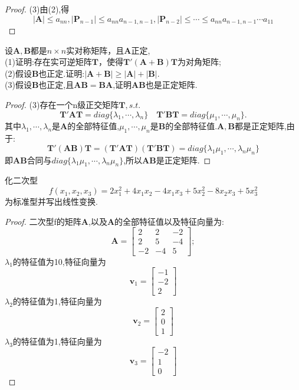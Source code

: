 \documentclass[lang=cn,11pt,normal]{elegantbook}
\begin{document}
	\begin{proof}
		(3)由(2),得
		$$
		|\boldsymbol{A}|\leq a_{nn},|\boldsymbol{P}_{n-1}|\leq a_{nn}a_{n-1,n-1},|\boldsymbol{P}_{n-2}|\leq \cdots\leq a_{nn}a_{n-1,n-1}\cdots a_{11}
		$$
	\end{proof}
	\begin{exercise}
		设$\boldsymbol{A},\boldsymbol{B}$都是$n\times n$实对称矩阵，且$\boldsymbol{A}$正定,\\
		(1)证明:存在实可逆矩阵$\boldsymbol{T}$，使得$\boldsymbol{T}'(\boldsymbol{A}+\boldsymbol{B})\boldsymbol{T}$为对角矩阵;\\
		(2)假设$\boldsymbol{B}$也正定.证明:$|\boldsymbol{A}+\boldsymbol{B}|\geq|\boldsymbol{A}|+|\boldsymbol{B}|.$\\
		(3)假设$\boldsymbol{B}$也正定,且$\boldsymbol{A}\boldsymbol{B}=\boldsymbol{B}\boldsymbol{A}$,证明$\boldsymbol{A}\boldsymbol{B}$也是正定矩阵.
	\end{exercise}
	\begin{proof}
		(3)存在一个n级正交矩阵$\boldsymbol{T},s.t.$
		$$
		\boldsymbol{T}'\boldsymbol{AT}=diag\{\lambda_1,\cdots,\lambda_n\}\quad\boldsymbol{T}'\boldsymbol{BT}=diag\{\mu_1,\cdots,\mu_n\}.
		$$
		其中$\lambda_1,\cdots,\lambda_n$是$\boldsymbol{A}$的全部特征值,$\mu_1,\cdots,\mu_n$是$\boldsymbol{B}$的全部特征值.$\boldsymbol{A},\boldsymbol{B}$都是正定矩阵,由于:
		$$
		\boldsymbol{T}'(\boldsymbol{AB})\boldsymbol{T}=(\boldsymbol{T}'\boldsymbol{AT})(\boldsymbol{T}'\boldsymbol{BT})=diag\{\lambda_1\mu_1,\cdots,\lambda_n\mu_n \}
		$$
		即$\boldsymbol{AB}$合同与$diag\{\lambda_1\mu_1,\cdots,\lambda_n\mu_n \}$,所以$\boldsymbol{AB}$是正定矩阵.
	\end{proof}
	\begin{exercise}
		化二次型
		$$
		f(x_1,x_2,x_3)=2x_1^2+4x_1x_2-4x_1x_3+5x_2^2-8x_2x_3+5x_3^2
		$$
		为标准型并写出线性变换.
	\end{exercise}
	\begin{proof}
		二次型f的矩阵$\boldsymbol{A}$,以及$\boldsymbol{A}$的全部特征值以及特征向量为:
		$$
		\boldsymbol{A}=
		\begin{bmatrix}
		2&2&-2\\
		2&5&-4\\
		-2&-4&5
		\end{bmatrix};
		$$
		$\lambda_1$的特征值为10,特征向量为$$\boldsymbol{v}_1=\begin{bmatrix}-1\\-2\\2\end{bmatrix}$$
		$\lambda_2$的特征值为1,特征向量为$$\boldsymbol{v}_2=\begin{bmatrix}2\\0\\1\end{bmatrix}$$
		$\lambda_3$的特征值为1,特征向量为$$\boldsymbol{v}_3=\begin{bmatrix}-2\\1\\0\end{bmatrix}$$
	\end{proof}
\end{document}
